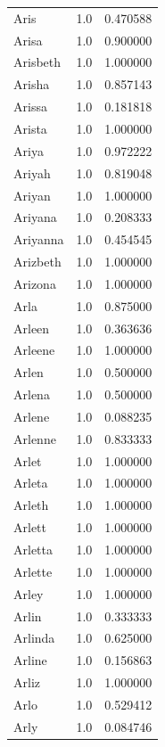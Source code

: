 \documentclass[
  letterpaper,
  DIV=11,
  numbers=noendperiod]{scrreprt}
\begin{document}
\begin{tabular}{lrr}
Aris            &   1.0 &   0.470588 \\
Arisa           &   1.0 &   0.900000 \\
Arisbeth        &   1.0 &   1.000000 \\
Arisha          &   1.0 &   0.857143 \\
Arissa          &   1.0 &   0.181818 \\
Arista          &   1.0 &   1.000000 \\
Ariya           &   1.0 &   0.972222 \\
Ariyah          &   1.0 &   0.819048 \\
Ariyan          &   1.0 &   1.000000 \\
Ariyana         &   1.0 &   0.208333 \\
Ariyanna        &   1.0 &   0.454545 \\
Arizbeth        &   1.0 &   1.000000 \\
Arizona         &   1.0 &   1.000000 \\
Arla            &   1.0 &   0.875000 \\
Arleen          &   1.0 &   0.363636 \\
Arleene         &   1.0 &   1.000000 \\
Arlen           &   1.0 &   0.500000 \\
Arlena          &   1.0 &   0.500000 \\
Arlene          &   1.0 &   0.088235 \\
Arlenne         &   1.0 &   0.833333 \\
Arlet           &   1.0 &   1.000000 \\
Arleta          &   1.0 &   1.000000 \\
Arleth          &   1.0 &   1.000000 \\
Arlett          &   1.0 &   1.000000 \\
Arletta         &   1.0 &   1.000000 \\
Arlette         &   1.0 &   1.000000 \\
Arley           &   1.0 &   1.000000 \\
Arlin           &   1.0 &   0.333333 \\
Arlinda         &   1.0 &   0.625000 \\
Arline          &   1.0 &   0.156863 \\
Arliz           &   1.0 &   1.000000 \\
Arlo            &   1.0 &   0.529412 \\
Arly            &   1.0 &   0.084746 \\

\end{tabular}
\end{document}
